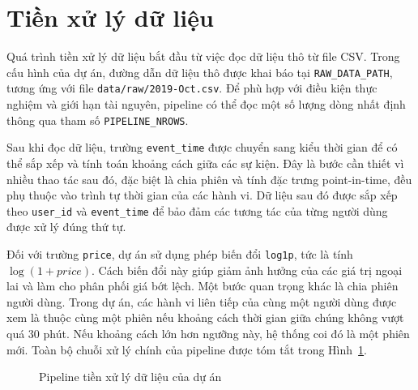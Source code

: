 \section{Tiền xử lý dữ liệu}
Quá trình tiền xử lý dữ liệu bắt đầu từ việc đọc dữ liệu thô từ file CSV. Trong cấu hình của dự án, đường dẫn dữ liệu thô được khai báo tại \texttt{RAW\_DATA\_PATH}, tương ứng với file \texttt{data/raw/2019-Oct.csv}. Để phù hợp với điều kiện thực nghiệm và giới hạn tài nguyên, pipeline có thể đọc một số lượng dòng nhất định thông qua tham số \texttt{PIPELINE\_NROWS}.
\medskip

Sau khi đọc dữ liệu, trường \texttt{event\_time} được chuyển sang kiểu thời gian để có thể sắp xếp và tính toán khoảng cách giữa các sự kiện. Đây là bước cần thiết vì nhiều thao tác sau đó, đặc biệt là chia phiên và tính đặc trưng point-in-time, đều phụ thuộc vào trình tự thời gian của các hành vi. Dữ liệu sau đó được sắp xếp theo \texttt{user\_id} và \texttt{event\_time} để bảo đảm các tương tác của từng người dùng được xử lý đúng thứ tự.
\medskip

Đối với trường \texttt{price}, dự án sử dụng phép biến đổi \texttt{log1p}, tức là tính $\log(1 + price)$. Cách biến đổi này giúp giảm ảnh hưởng của các giá trị ngoại lai và làm cho phân phối giá bớt lệch. Một bước quan trọng khác là chia phiên người dùng. Trong dự án, các hành vi liên tiếp của cùng một người dùng được xem là thuộc cùng một phiên nếu khoảng cách thời gian giữa chúng không vượt quá 30 phút. Nếu khoảng cách lớn hơn ngưỡng này, hệ thống coi đó là một phiên mới. Toàn bộ chuỗi xử lý chính của pipeline được tóm tắt trong Hình~\ref{fig:data_pipeline_flow}.

\begin{figure}[H]
\centering
{}
\caption[Pipeline tiền xử lý dữ liệu]{Pipeline tiền xử lý dữ liệu của dự án}
\label{fig:data_pipeline_flow}
\end{figure}

